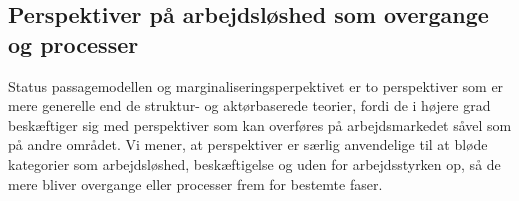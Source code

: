 \subsection{Perspektiver på arbejdsløshed som overgange og processer} 

Status passagemodellen og marginaliseringsperpektivet er to perspektiver som er mere generelle end de struktur- og aktørbaserede teorier, fordi de i højere grad beskæftiger sig med perspektiver som kan overføres på arbejdsmarkedet såvel som på andre området. Vi mener, at perspektiver er særlig anvendelige til at bløde kategorier som arbejdsløshed, beskæftigelse og uden for arbejdsstyrken op, så de mere bliver overgange eller processer frem for bestemte faser. %

